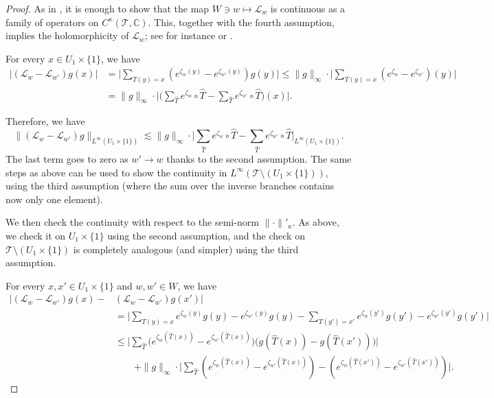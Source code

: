 \documentclass[11pt]{amsart}
\theoremstyle{plain}
\theoremstyle{definition}
\theoremstyle{remark}
\begin{document}
\begin{proof}
As in \cite[Proposition 2.9]{BH24},
it is enough to show that the map $W \ni w \mapsto \mathcal{L}_{w}$ is continuous as a family of operators on $C^{\kappa}(\mathcal T,\mathbb{C})$. This, together with the fourth assumption, implies the holomorphicity of $\mathcal L_w$; see for instance \cite[Lemma 7.1]{UZ04real} or \cite[Lemma 5.1]{SU10}.    



For every $x \in 
U_1 \times \{1\}$, we have
\begin{align*}
|(\mathcal{L}_w-\mathcal{L}_{w'})g(x)| & = 
\Big|\sum_{T(y)=x}\left(e^{\zeta_w(y)} - e^{\zeta_{w'}(y)}\right)g(y)\Big| 
 \le \|g\|_\infty \cdot \Big|\sum_{T(y)=x}(e^{\zeta_w} - e^{\zeta_{w'}})(y)\Big| \\
&= \|g\|_\infty \cdot \Big|\Big(\sum_{\hat T} e^{\zeta_w} \circ \hat T - \sum_{\hat T} e^{\zeta_{w'}}\circ \hat T \Big)  (x)\Big|.
\end{align*}

Therefore,
we have
$$\|(\mathcal{L}_w-\mathcal{L}_{w'})g\|_{L^\infty (
U_1 \times \{1\})} 
\lesssim \|g\|_\infty \cdot  \Big|
\sum_{\hat T} e^{\zeta_w} \circ \hat{T} - \sum_{\hat T} e^{\zeta_{w'}} \circ \hat{T}\Big|_{L^\infty (
U_1 \times \{1\}
)}.$$
The last term goes to zero as $w'\to w$
thanks to the second assumption.
The same steps as above can be used
to show the continuity in $L^\infty (\mathcal T\setminus 
(U_1 \times \{1\}))$, using the third assumption (where the sum over the inverse branches
contains now only one element).

\medskip

We then check the continuity 
with respect to
the semi-norm 
$\|\cdot\|'_\kappa$.
As above, we check it on 
$U_1 \times \{1\}$
using the second assumption, and the check on $\mathcal T\setminus
(U_1 \times \{1\})$ is completely analogous (and simpler) using the third assumption.

For every
$x,x' \in 
U_1 \times \{1\}$
and $w,w'\in W$,
we have
\begin{align*}
| (\mathcal{L}_w-\mathcal{L}_{w'})g(x)  -& (\mathcal{L}_w  -\mathcal{L}_{w'})g(x')| \\
& = \Big|\sum_{T(y)=x}e^{\zeta_w(y)}g(y)- e^{\zeta_{w'}(y)}g(y) - \sum_{T(y')=x'}e^{\zeta_w(y')}g(y')- e^{\zeta_{w'}(y')}g(y')\Big|\\
&\le 
\Big|\sum_{\hat T}
\big(
e^{\zeta_{w}(\hat T (x))}-e^{\zeta_{w'}(\hat T (x))}
\big)
\big(
g(\hat T (x))-g(\hat T(x'))
\big) 
\Big|\\
& \quad \quad + \|g\|_\infty \cdot 
\Big|
\sum_{\hat T}
(e^{\zeta_{w}(\hat T (x))}-e^{\zeta_{w'}(\hat T (x))})-(e^{\zeta_{w}(\hat T (x'))}-e^{\zeta_{w'}(\hat T (x'))})\Big|.
\end{align*}


\end{proof}
\end{document}
